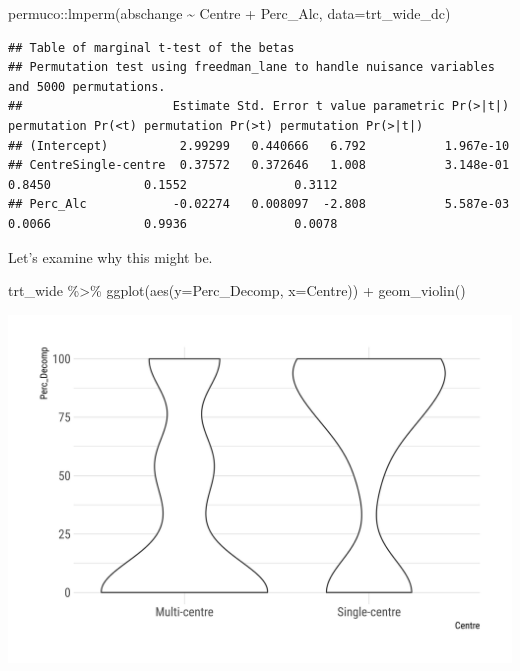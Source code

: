 \documentclass[
]{article}
\newenvironment{Shaded}{\begin{snugshade}}{\end{snugshade}}
\newcommand{\AttributeTok}[1]{\textcolor[rgb]{0.77,0.63,0.00}{#1}}
\newcommand{\FunctionTok}[1]{\textcolor[rgb]{0.00,0.00,0.00}{#1}}
\newcommand{\NormalTok}[1]{#1}
\newcommand{\SpecialCharTok}[1]{\textcolor[rgb]{0.00,0.00,0.00}{#1}}
\begin{document}
\begin{Shaded}
\begin{Highlighting}[]
\NormalTok{permuco}\SpecialCharTok{::}\FunctionTok{lmperm}\NormalTok{(abschange }\SpecialCharTok{\textasciitilde{}}\NormalTok{ Centre }\SpecialCharTok{+}\NormalTok{ Perc\_Alc, }\AttributeTok{data=}\NormalTok{trt\_wide\_dc)}
\end{Highlighting}
\end{Shaded}

\begin{verbatim}
## Table of marginal t-test of the betas
## Permutation test using freedman_lane to handle nuisance variables and 5000 permutations.
##                     Estimate Std. Error t value parametric Pr(>|t|) permutation Pr(<t) permutation Pr(>t) permutation Pr(>|t|)
## (Intercept)          2.99299   0.440666   6.792           1.967e-10                                                           
## CentreSingle-centre  0.37572   0.372646   1.008           3.148e-01             0.8450             0.1552               0.3112
## Perc_Alc            -0.02274   0.008097  -2.808           5.587e-03             0.0066             0.9936               0.0078
\end{verbatim}

Let's examine why this might be.

\begin{Shaded}
\begin{Highlighting}[]
\NormalTok{trt\_wide }\SpecialCharTok{\%\textgreater{}\%} 
  \FunctionTok{ggplot}\NormalTok{(}\FunctionTok{aes}\NormalTok{(}\AttributeTok{y=}\NormalTok{Perc\_Decomp, }\AttributeTok{x=}\NormalTok{Centre)) }\SpecialCharTok{+} 
  \FunctionTok{geom\_violin}\NormalTok{()}
\end{Highlighting}
\end{Shaded}

\includegraphics{figures/unnamed-chunk-42-1.png}
\end{document}

